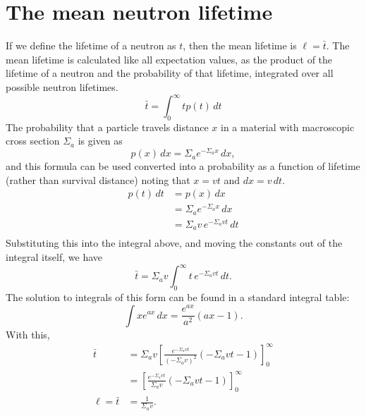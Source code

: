 \documentclass{report}
\begin{document}
\newpage
\section*{The mean neutron lifetime}
\label{meanlifetime}
If we define the lifetime of a neutron as $t$, then the mean lifetime is $\ell = \bar{t}$. The mean lifetime is calculated like all expectation values, as the product of the lifetime of a neutron and the probability of that lifetime, integrated over all possible neutron lifetimes.
$$\bar{t} = \int_0^{\infty} t p(t) \, dt $$
The probability that a particle travels distance $x$ in a material with macroscopic cross section $\Sigma_a$ is given as
$$ p(x) \, dx = \Sigma_a e^{-\Sigma_a x} \, dx ,$$		 									
and this formula can be used converted into a probability as a function of lifetime (rather than survival distance) noting that $x = vt$ and $dx = v\,dt$. 
\begin{align*}
p(t) \, dt	&= p(x) \, dx \\
			&= \Sigma_a e^{-\Sigma_a x} \, dx \\
			&= \Sigma_a v \, e^{-\Sigma_a vt} \, dt \\
\end{align*}
Substituting this into the integral above, and moving the constants out of the integral itself, we have
$$ \bar{t} = \Sigma_a v\int_0^{\infty} t \, e^{-\Sigma_a vt} \, dt .$$
The solution to integrals of this form can be found in a standard integral table:
$$ \int x e^{ax} \, dx = \frac{e^{ax}}{a^2}(ax-1) .$$   
With this, 
\begin{align*}
\bar{t}	&= \Sigma_a v \left[ \frac{e^{-\Sigma_a vt}}{\left(-\Sigma_a v\right)^2}(-\Sigma_a v t-1) \right]_0^{\infty} \\
		&= \left[ \frac{e^{-\Sigma_a vt}}{\Sigma_a v}(-\Sigma_a v t-1) \right]_0^{\infty} \\
\ell = \bar{t}	&= \frac{1}{\Sigma_a v} . \end{align*}
\end{document}
